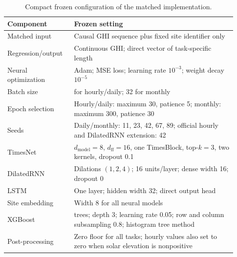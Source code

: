 \begin{table}[!t]
\centering
\caption{Compact frozen configuration of the matched implementation.}
\label{tab:hyperparameters}
\footnotesize
\setlength{\tabcolsep}{3pt}
\renewcommand{\arraystretch}{1.12}
\begin{tabular}{@{}
  >{\raggedright\arraybackslash}p{0.27\linewidth}
  >{\raggedright\arraybackslash}p{0.66\linewidth}@{}}
\toprule
\textbf{Component} & \textbf{Frozen setting} \\
\midrule
Matched input & Causal GHI sequence plus fixed site identifier only \\
Regression/output & Continuous GHI; direct vector of task-specific length \\
Neural optimization & Adam; MSE loss; learning rate $10^{-3}$;
weight decay $10^{-5}$ \\
Batch size & 128 for hourly/daily; 32 for monthly \\
Epoch selection & Hourly/daily: maximum 30, patience 5; monthly:
maximum 300, patience 30 \\
Seeds & Daily/monthly: 11, 23, 42, 67, 89; official hourly and
DilatedRNN extension: 42 \\
TimesNet & $d_{\mathrm{model}}=8$, $d_{\mathrm{ff}}=16$, one TimesBlock,
top-$k=3$, two kernels, dropout 0.1 \\
DilatedRNN & Dilations $(1,2,4)$; 16 units/layer; dense width 16;
dropout 0 \\
LSTM & One layer; hidden width 32; direct output head \\
Site embedding & Width 8 for all neural models \\
XGBoost & 150 trees; depth 3; learning rate 0.05; row and column
subsampling 0.8; histogram tree method \\
Post-processing & Zero floor for all tasks; hourly values also set to zero
when solar elevation is nonpositive \\
\bottomrule
\end{tabular}
\end{table}
